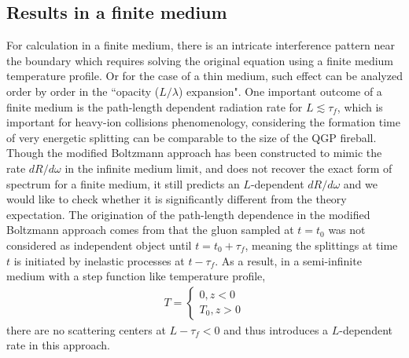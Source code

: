 \documentclass[aps, prc, reprint, amsmath, groupedaddress, nofootinbib]{revtex4-1}
\begin{document}
\subsection{Results in a finite medium}
For calculation in a finite medium, there is an intricate interference pattern near the boundary which requires solving the original equation using a finite medium temperature profile. Or for the case of a thin medium, such effect can be analyzed order by order in the ``opacity ($L/\lambda$) expansion". 
One important outcome of a finite medium is the path-length dependent radiation rate for $L \lesssim \tau_f$, which is important for heavy-ion collisions phenomenology, considering the formation time of very energetic splitting can be comparable to the size of the QGP fireball.
Though the modified Boltzmann approach has been constructed to mimic the rate $dR/d\omega$ in the infinite medium limit, and does not recover the exact form of spectrum for a finite medium, it still predicts an $L$-dependent $dR/d\omega$ and we would like to check whether it is significantly different from the theory expectation.
The origination of the path-length dependence in the modified Boltzmann approach comes from that the gluon sampled at $t=t_0$ was not considered as independent object until $t = t_0+\tau_f$, meaning the splittings at time $t$ is initiated by inelastic processes at $t-\tau_f$.
As a result, in a semi-infinite medium with a step function like temperature profile, 
\begin{eqnarray}
T = \begin{cases}
0 , z<0\\
T_0, z>0
\end{cases}
\end{eqnarray}
there are no scattering centers at $L-\tau_f<0$ and thus introduces a $L$-dependent rate in this approach.
\end{document}
